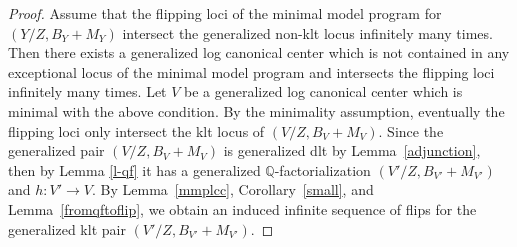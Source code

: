 \documentclass{amsart}
\renewcommand{\qq}{\mathbb{Q}}
\theoremstyle{remark}
\numberwithin{equation}{section}
\begin{document}
\begin{proof}
Assume that the flipping loci of the minimal model program for $(Y/Z,B_Y+M_Y)$ intersect the generalized non-klt locus infinitely many times. Then there exists a generalized log canonical center which is not contained in any exceptional locus of the minimal model program and intersects the flipping loci infinitely many times. Let $V$ be a generalized log canonical center which is minimal with the above condition. By the minimality assumption, eventually the flipping loci only intersect the klt locus of $(V/Z,B_V+M_V)$. Since the generalized pair $(V/Z,B_V+M_V)$ is generalized dlt by Lemma~\ref{adjunction},  then by Lemma \ref{l-qf} it has a generalized $\qq$-factorialization $(V'/Z, B_{V'}+M_{V'})$ and $h:V'\to V$. By Lemma~\ref{mmplcc}, Corollary~\ref{small}, and Lemma~\ref{fromqftoflip}, we obtain an induced infinite sequence of flips for the generalized klt pair $(V'/Z,B_{V'}+M_{V'})$.
\end{proof}
\end{document}
